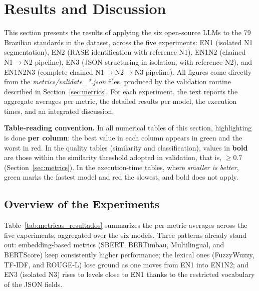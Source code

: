\documentclass[a4paper,fleqn]{cas-sc}
\newcommand{\melhor}[1]{\textcolor{green!55!black}{#1}}
\newcommand{\pior}[1]{\textcolor{red!80!black}{#1}}
\begin{document}
\section{Results and Discussion}\label{sec:results}

This section presents the results of applying the six open-source LLMs to the 79 Brazilian standards in the dataset, across the five experiments: EN1 (isolated N1 segmentation), EN2 (RASE identification with reference N1), EN1N2 (chained N1$\rightarrow$N2 pipeline), EN3 (JSON structuring in isolation, with reference N2), and EN1N2N3 (complete chained N1$\rightarrow$N2$\rightarrow$N3 pipeline). All figures come directly from the \textit{metrics/validate\_*.json} files, produced by the validation routine described in Section~\ref{sec:metrics}. For each experiment, the text reports the aggregate averages per metric, the detailed results per model, the execution times, and an integrated discussion.

\textbf{Table-reading convention.} In all numerical tables of this section, highlighting is done \textbf{per column}: the best value in each column appears in \melhor{green} and the worst in \pior{red}. In the quality tables (similarity and classification), values in \textbf{bold} are those within the similarity threshold adopted in validation, that is, \(\geq 0.7\) (Section~\ref{sec:metrics}). In the execution-time tables, where \emph{smaller is better}, \melhor{green} marks the fastest model and \pior{red} the slowest, and bold does not apply.

\subsection{Overview of the Experiments}

Table~\ref{tab:metricas_resultados} summarizes the per-metric averages across the five experiments, aggregated over the six models. Three patterns already stand out: embedding-based metrics (SBERT, BERTimbau, Multilingual, and BERTScore) keep consistently higher performance; the lexical ones (FuzzyWuzzy, TF-IDF, and ROUGE-L) lose ground as one moves from EN1 into EN1N2; and EN3 (isolated N3) rises to levels close to EN1 thanks to the restricted vocabulary of the JSON fields.
\end{document}
